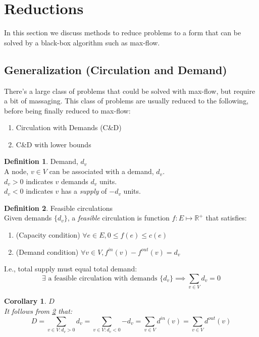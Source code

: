 \documentclass{article}
\newtheorem{corollary}{Corollary}[theorem]
\theoremstyle{definition}
\newtheorem{definition}{Definition}[section]
\begin{document}
\section{Reductions}
In this section we discuss methods to reduce problems to a form that can be solved by a black-box algorithm such as max-flow.

\subsection{Generalization (Circulation and Demand)}
There's a large class of problems that could be solved with max-flow, but require a bit of massaging. This class of problems are usually reduced to the following, before being finally reduced to max-flow:

\begin{enumerate}
	\item Circulation with Demands (C\&D)
	\item C\&D with lower bounds
\end{enumerate}

\begin{definition}{Demand, $d_v$}
\label{def:demand}
	\\A node, $v \in V$ can be associated with a demand, $d_v$. 
	\\$d_v >0$ indicates $v$ demands $d_v$ units. 
	\\$d_v < 0$ indicates $v$ has a \textit{supply} of $-d_v$ units.
\end{definition}

\begin{definition}{Feasible circulations}
	\label{def:feas_circulation}
	\\Given demands $\{d_v\}$, a \textit{feasible} circulation is function $f: E \mapsto \mathbb{R}^+$ that satisfies:
	
	\begin{enumerate}
		\item (Capacity condition) $\forall e \in E, 0 \leq f(e) \leq c(e)$
		\item (Demand condition) $\forall v \in V, f^{in}(v) - f^{out}(v) = d_v$
	\end{enumerate}

	I.e., total supply must equal total demand:
	$$\exists \text{ a feasible circulation with demands } \{d_v\} \implies \sum_{v \in V}{d_v} = 0$$
\end{definition}

\begin{corollary}{$D$}
	\\It follows from \ref{def:feas_circulation} that:
	$$D = \sum_{v \in V: d_v > 0}{d_v} = \sum_{v \in V: d_v < 0}{-d_v} = \sum_{v \in V}{d^{in}(v)} =\sum_{v \in V}{d^{out}(v)}$$
\end{corollary}
\end{document}
